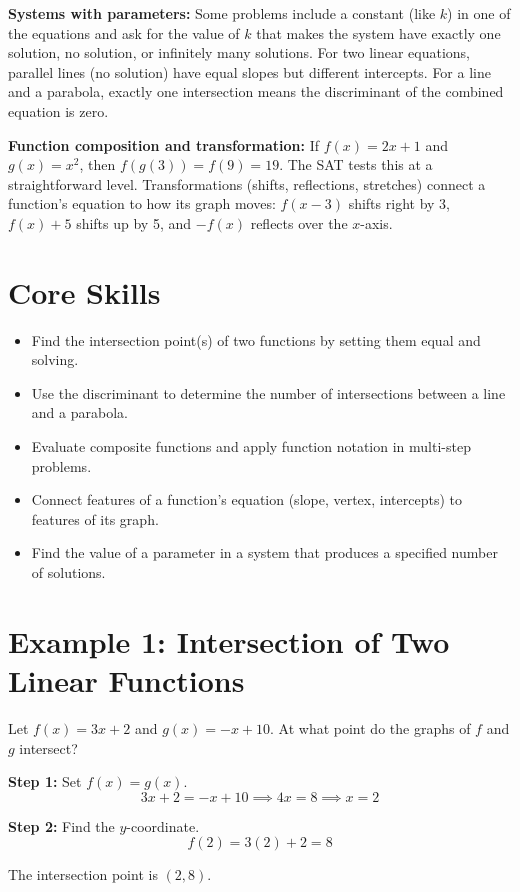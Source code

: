 \documentclass[14pt]{extarticle}
\begin{document}
\textbf{Systems with parameters:} Some problems include a constant (like \(k\)) in one of the equations and ask for the value of \(k\) that makes the system have exactly one solution, no solution, or infinitely many solutions. For two linear equations, parallel lines (no solution) have equal slopes but different intercepts. For a line and a parabola, exactly one intersection means the discriminant of the combined equation is zero.

\textbf{Function composition and transformation:} If \(f(x) = 2x + 1\) and \(g(x) = x^2\), then \(f(g(3)) = f(9) = 19\). The SAT tests this at a straightforward level. Transformations (shifts, reflections, stretches) connect a function's equation to how its graph moves: \(f(x - 3)\) shifts right by 3, \(f(x) + 5\) shifts up by 5, and \(-f(x)\) reflects over the \(x\)-axis.

\section*{Core Skills}
\begin{itemize}
  \item Find the intersection point(s) of two functions by setting them equal and solving.
  \item Use the discriminant to determine the number of intersections between a line and a parabola.
  \item Evaluate composite functions and apply function notation in multi-step problems.
  \item Connect features of a function's equation (slope, vertex, intercepts) to features of its graph.
  \item Find the value of a parameter in a system that produces a specified number of solutions.
\end{itemize}

\section*{Example 1: Intersection of Two Linear Functions}

Let \(f(x) = 3x + 2\) and \(g(x) = -x + 10\). At what point do the graphs of \(f\) and \(g\) intersect?

\textbf{Step 1:} Set \(f(x) = g(x)\).
\[
3x + 2 = -x + 10 \implies 4x = 8 \implies x = 2
\]

\textbf{Step 2:} Find the \(y\)-coordinate.
\[
f(2) = 3(2) + 2 = 8
\]

The intersection point is \(\boxed{(2, 8)}\).
\end{document}
